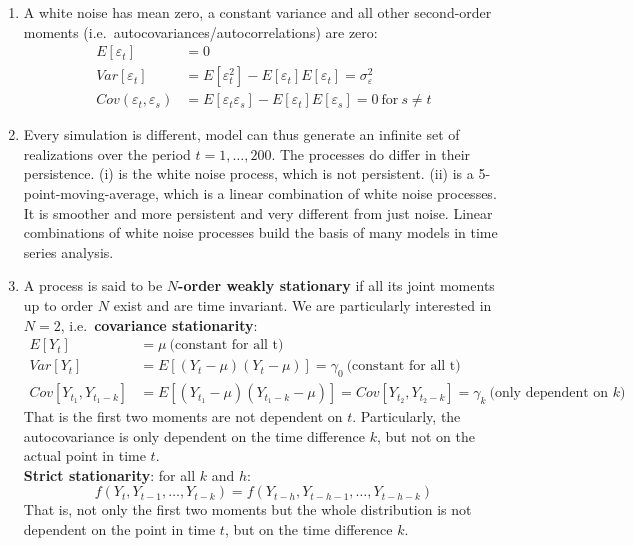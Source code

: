 \begin{enumerate}

\item
A white noise has mean zero, a constant variance and all other second-order moments (i.e.\ autocovariances/autocorrelations) are zero:
\begin{align*}
    E[\varepsilon_t]&=0\\
    Var[\varepsilon_t]&=E[\varepsilon_t^2] - E[\varepsilon_t]E[\varepsilon_t] = \sigma_\varepsilon^2\\
    Cov(\varepsilon_{t},\varepsilon_s) &= E[\varepsilon_t \varepsilon_s] - E[\varepsilon_t]E[\varepsilon_s] = 0~\text{for}~s \neq t
\end{align*}	

\item

Every simulation is different, model can thus generate an infinite set of realizations over the period \(t=1,\ldots ,200\).
The processes do differ in their persistence.
(i) is the white noise process, which is not persistent.
(ii) is a 5-point-moving-average, which is a linear combination of white noise processes.
It is smoother and more persistent and very different from just noise.
Linear combinations of white noise processes build the basis of many models in time series analysis.

\item
A process is said to be \textbf{\(N\)-order weakly stationary} if all its joint moments up to order \(N\) exist and are time invariant.
We are particularly interested in \(N=2\), i.e.\ \textbf{covariance stationarity}:
\begin{align*}
E[Y_t]&=\mu~\text{(constant for all t)}
\\
Var[Y_t]&=E[(Y_t - \mu)(Y_t-\mu)]=\gamma_0~\text{(constant for all t)}
\\
Cov[Y_{t_1},Y_{t_1-k}] &= E[(Y_{t_1}-\mu)(Y_{t_1-k}-\mu)] = Cov[Y_{t_2},Y_{t_2-k}] = \gamma_k~\text{(only dependent on \(k\))}
\end{align*}
That is the first two moments are not dependent on \(t\).
Particularly, the autocovariance is only dependent on the time difference \(k\), but not on the actual point in time \(t\).
\\
\textbf{Strict stationarity}: for all \(k\) and \(h\):
\[f(Y_t,Y_{t-1},\ldots ,Y_{t-k})=f(Y_{t-h},Y_{t-h-1},\ldots ,Y_{t-h-k})\]
That is, not only the first two moments but the whole distribution is not dependent on the point in time \(t\),
  but on the time difference \(k\).


\end{enumerate}
